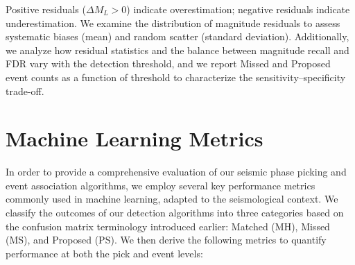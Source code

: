 Positive residuals ($\Delta M_L > 0$) indicate overestimation; negative
residuals indicate underestimation. We examine the distribution of magnitude
residuals to assess systematic biases (mean) and random scatter (standard
deviation). Additionally, we analyze how residual statistics and the balance
between magnitude recall and \ac{FDR} vary with the detection threshold, and
we report Missed and Proposed event counts as a function of threshold to
characterize the sensitivity--specificity trade-off.

\section{Machine Learning Metrics}
In order to provide a comprehensive evaluation of our seismic phase picking and
event association algorithms, we employ several key performance metrics
commonly used in machine learning, adapted to the seismological context. We
classify the outcomes of our detection algorithms into three categories based
on the confusion matrix terminology introduced earlier: Matched (MH), Missed
(MS), and Proposed (PS). We then derive the following metrics to quantify
performance at both the pick and event levels:
